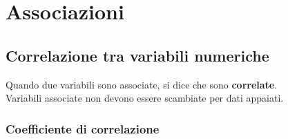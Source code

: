 \documentclass[10pt, draft]{book}
\begin{document}
\part{Associazioni}

\chapter{Correlazione tra variabili numeriche}

Quando due variabili sono associate, si dice che sono \textbf{correlate}.\\
Variabili associate non devono essere scambiate per dati appaiati.\\

\section{Coefficiente di correlazione}
\end{document}
